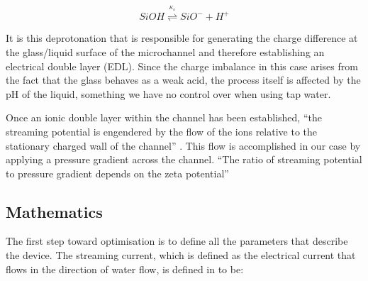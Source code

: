 \begin{equation}
SiOH\overset{^{K_{a}}}{\mathbf{\rightleftharpoons}}SiO^{-}+H^{+}
\end{equation}


It is this deprotonation that is responsible for generating the charge
difference at the glass/liquid surface of the microchannel and therefore
establishing an electrical double layer (EDL). Since the charge imbalance
in this case arises from the fact that the glass behaves as a weak
acid, the process itself is affected by the pH of the liquid, something
we have no control over when using tap water.

Once an ionic double layer within the channel has been established,
``the streaming potential is engendered by the flow of the ions relative
to the stationary charged wall of the channel'' \cite{Mansouri2005}.
This flow is accomplished in our case by applying a pressure gradient
across the channel. ``The ratio of streaming potential to pressure
gradient depends on the zeta potential''\cite{Park2009}


\subsection{\label{sub:StreamingCell-Mathematics}Mathematics}

The first step toward optimisation is to define all the parameters
that describe the device. The streaming current, which is defined
as the electrical current that flows in the direction of water flow,
is defined in \cite{Olthuis2005} to be:

